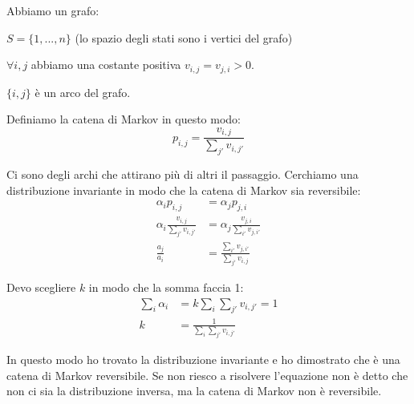 \documentclass[a4paper,12pt]{book}
\newcommand\ddfrac[2]{\frac{\displaystyle #1}{\displaystyle #2}}
\begin{document}
Abbiamo un grafo:
\begin{multicols}{2}
	
	
	$ S = \{1,...,n\} $ (lo spazio degli stati sono i vertici del grafo)
	
	$ \forall i,j $ abbiamo una costante positiva $ v_{i,j} = v_{j,i} > 0 $.
	
	$ \{i,j\} $ è un arco del grafo.
\end{multicols}

Definiamo la catena di Markov in questo modo:
$$ p_{i,j} = \ddfrac{v_{i,j}}{\sum_{j'}v_{i,j'}} $$

Ci sono degli archi che attirano più di altri il passaggio. Cerchiamo una distribuzione invariante in modo che la catena di Markov sia reversibile:
\begin{align*}
	\alpha_{i}p_{i,j} & = \alpha_{j}p_{j,i} \\
	\alpha_{i}\ddfrac{v_{i,j}}{\sum_{j'}v_{i,j'}} & = 	\alpha_{j}\ddfrac{v_{j,i}}{\sum_{i'}v_{j,i'}} \\
	\ddfrac{a_j}{a_i} & = \frac{\sum_{i'}v_{j,i'}}{\sum_{j'}v_{i,j}}
\end{align*}

Devo scegliere $ k $ in modo che la somma faccia 1:
\begin{align*}
	\sum_{i}\alpha_{i} & = k\sum_{i}\sum_{j'}v_{i,j'} = 1 \\
	k & = \ddfrac{1}{\sum_{i}\sum_{j'}v_{i,j'}}
\end{align*}

In questo modo ho trovato la distribuzione invariante e ho dimostrato che è una catena di Markov reversibile. Se non riesco a risolvere l'equazione non è detto che non ci sia la distribuzione inversa, ma la catena di Markov non è reversibile. 
\end{document}
